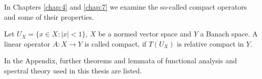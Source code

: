 In Chapters \ref{chap:4} and \ref{chap:7} we examine the so-called compact operators and some of their properties.

\begin{definition}
	Let $U_{X} = \{ x \in X \colon |x| < 1 \}$, $X$ be a normed vector space and $Y$ a Banach space. A linear operator $A \colon X \rightarrow Y$ is called compact, if $T(U_{X})$ is relative compact in $Y$.
\end{definition}

In the Appendix, further theorems and lemmata of functional analysis and spectral theory used in this thesis are listed.